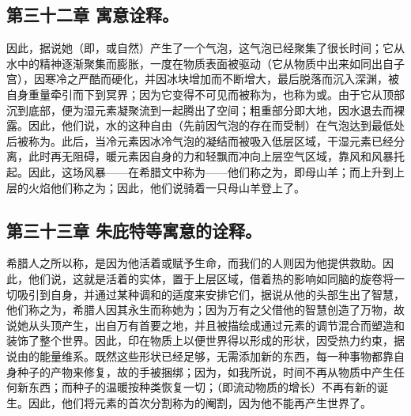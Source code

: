 
\subsection{第三十二章 寓意诠释。}

因此，据说她（即，或自然）产生了一个气泡，这气泡已经聚集了很长时间；它从水中的精神逐渐聚集而膨胀，一度在物质表面被驱动（它从物质中出来如同出自子宫），因寒冷之严酷而硬化，并因冰块增加而不断增大，最后脱落而沉入深渊，被自身重量牵引而下到冥界；因为它变得不可见而被称为，也称为或。由于它从顶部沉到底部，便为湿元素凝聚流到一起腾出了空间；粗重部分即大地，因水退去而裸露。因此，他们说，水的这种自由（先前因气泡的存在而受制）在气泡达到最低处后被称为。此后，当冷元素因冰冷气泡的凝结而被吸入低层区域，干湿元素已经分离，此时再无阻碍，暖元素因自身的力和轻飘而冲向上层空气区域，靠风和风暴托起。因此，这场风暴——在希腊文中称为——他们称之为，即母山羊；而上升到上层的火焰他们称之为；因此，他们说骑着一只母山羊登上了。\par


\subsection{第三十三章 朱庇特等寓意的诠释。}

希腊人之所以称，是因为他活着或赋予生命，而我们的人则因为他提供救助。因此，他们说，这就是活着的实体，置于上层区域，借着热的影响如同脑的旋卷将一切吸引到自身，并通过某种调和的适度来安排它们，据说从他的头部生出了智慧，他们称之为，希腊人因其永生而称她为；因为万有之父借他的智慧创造了万物，故说她从头顶产生，出自万有首要之地，并且被描绘成通过元素的调节混合而塑造和装饰了整个世界。因此，印在物质上以便世界得以形成的形状，因受热力约束，据说由的能量维系。既然这些形状已经足够，无需添加新的东西，每一种事物都靠自身种子的产物来修复，故的手被捆绑；因为，如我所说，时间不再从物质中产生任何新东西；而种子的温暖按种类恢复一切；（即流动物质的增长）不再有新的诞生。因此，他们将元素的首次分割称为的阉割，因为他不能再产生世界了。\par

